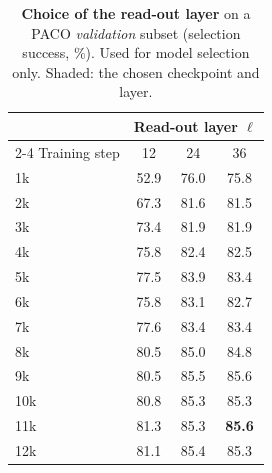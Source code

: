 \begin{table}[t]
\centering
\caption{\textbf{Choice of the read-out layer} on a PACO \emph{validation} subset (selection success, \%). Used for
model selection only. Shaded: the chosen checkpoint and layer.}
\label{tab:readout_layer}
\setlength{\tabcolsep}{8pt}
\begin{tabular}{l ccc}
\toprule
 & \multicolumn{3}{c}{Read-out layer $\ell$} \\
\cmidrule(lr){2-4}
Training step & 12 & 24 & 36 \\
\midrule
1k & 52.9 & 76.0 & 75.8 \\
2k & 67.3 & 81.6 & 81.5 \\
3k & 73.4 & 81.9 & 81.9 \\
4k & 75.8 & 82.4 & 82.5 \\
5k & 77.5 & 83.9 & 83.4 \\
6k & 75.8 & 83.1 & 82.7 \\
7k & 77.6 & 83.4 & 83.4 \\
8k & 80.5 & 85.0 & 84.8 \\
9k & 80.5 & 85.5 & 85.6 \\
10k & 80.8 & 85.3 & 85.3 \\
\rowcolor{oursrow}
11k & 81.3 & 85.3 & \textbf{85.6} \\
12k & 81.1 & 85.4 & 85.3 \\
\bottomrule
\end{tabular}
\end{table}
